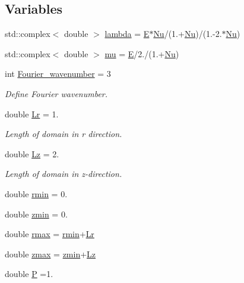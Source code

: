 \subsection*{Variables}
\begin{DoxyCompactItemize}
\item 
std\+::complex$<$ double $>$ \hyperlink{namespaceGlobal__Parameters_a2ecf9fe185c1e5b5cae06a6ed0a3b5a2}{lambda} = \hyperlink{namespaceGlobal__Parameters_ac74d762d76b56416281173421b018460}{E}$\ast$\hyperlink{namespaceGlobal__Parameters_a5978c2a1498ec7775b228a11a3912209}{Nu}/(1.+\hyperlink{namespaceGlobal__Parameters_a5978c2a1498ec7775b228a11a3912209}{Nu})/(1.-\/2.$\ast$\hyperlink{namespaceGlobal__Parameters_a5978c2a1498ec7775b228a11a3912209}{Nu})
\item 
std\+::complex$<$ double $>$ \hyperlink{namespaceGlobal__Parameters_a49a27047b96fb3d9ec374f7649e46d89}{mu} = \hyperlink{namespaceGlobal__Parameters_ac74d762d76b56416281173421b018460}{E}/2./(1.+\hyperlink{namespaceGlobal__Parameters_a5978c2a1498ec7775b228a11a3912209}{Nu})
\item 
int \hyperlink{namespaceGlobal__Parameters_ae1198385d90f52c4ed921520ae43a9e7}{Fourier\+\_\+wavenumber} = 3
\begin{DoxyCompactList}\small\item\em Define Fourier wavenumber. \end{DoxyCompactList}\item 
double \hyperlink{namespaceGlobal__Parameters_a444f5c911c8805ad2ba45ed8b1b8904e}{Lr} = 1.
\begin{DoxyCompactList}\small\item\em Length of domain in r direction. \end{DoxyCompactList}\item 
double \hyperlink{namespaceGlobal__Parameters_a2bcf0bd846d839f1e3bb04a6c0a612c1}{Lz} = 2.
\begin{DoxyCompactList}\small\item\em Length of domain in z-\/direction. \end{DoxyCompactList}\item 
double \hyperlink{namespaceGlobal__Parameters_ad454d80ae621f272dd1d7932249545a5}{rmin} = 0.
\item 
double \hyperlink{namespaceGlobal__Parameters_ac6a17dbcf1b8f1136a1ec5c07efef708}{zmin} = 0.
\item 
double \hyperlink{namespaceGlobal__Parameters_a5d7fb394c980bb4bf2a52158f9d7cc50}{rmax} = \hyperlink{namespaceGlobal__Parameters_ad454d80ae621f272dd1d7932249545a5}{rmin}+\hyperlink{namespaceGlobal__Parameters_a444f5c911c8805ad2ba45ed8b1b8904e}{Lr}
\item 
double \hyperlink{namespaceGlobal__Parameters_a8ee2afb91b9b105939f19a0efa8e1441}{zmax} = \hyperlink{namespaceGlobal__Parameters_ac6a17dbcf1b8f1136a1ec5c07efef708}{zmin}+\hyperlink{namespaceGlobal__Parameters_a2bcf0bd846d839f1e3bb04a6c0a612c1}{Lz}
\item 
double \hyperlink{namespaceGlobal__Parameters_a31fb55c20db4aa0127aafa20f0d76731}{P} =1.
\end{DoxyCompactItemize}


